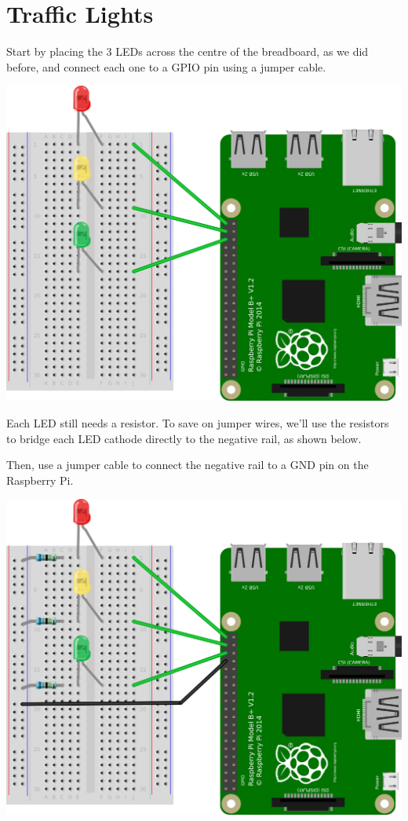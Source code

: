 \section{Traffic Lights}

	Start by placing the 3 LEDs across the centre of the breadboard, as we did before, and connect each one to a GPIO pin using a jumper cable.

	\begin{center}
		\includegraphics[width=0.7\linewidth]{McrRaspJam/015_GPIOZero/2_trafficlight/2}
	\end{center}

	Each LED still needs a resistor. To save on jumper wires, we'll use the resistors to bridge each LED cathode directly to the negative rail, as shown below.
	
	Then, use a jumper cable to connect the negative rail to a GND pin on the Raspberry Pi.

	\begin{center}
		\includegraphics[width=0.7\linewidth]{McrRaspJam/015_GPIOZero/2_trafficlight/3}
	\end{center}

